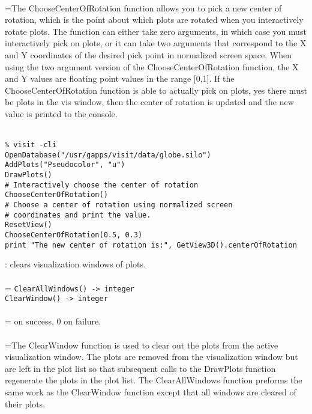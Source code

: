 \documentclass[10pt,a4paper]{report}
\begin{document}
 \\ 
\hangindent=\parindent The ChooseCenterOfRotation function allows you to pick a new center of rotation, which is the point about which plots are rotated when you interactively rotate plots. The function can either take zero arguments, in which case you must interactively pick on plots, or it can take two arguments that correspond to the X and Y coordinates of the desired pick point in normalized screen space. When using the two argument version of the ChooseCenterOfRotation function, the X and Y values are floating point values in the range [0,1]. If the ChooseCenterOfRotation function is able to actually pick on plots, yes there must be plots in the vis window, then the center of rotation is updated and the new value is printed to the console. \\[-3mm] 

\\[-6mm]
\begin{verbatim}% visit -cli
OpenDatabase("/usr/gapps/visit/data/globe.silo")
AddPlots("Pseudocolor", "u")
DrawPlots()
# Interactively choose the center of rotation
ChooseCenterOfRotation()
# Choose a center of rotation using normalized screen 
# coordinates and print the value.
ResetView()
ChooseCenterOfRotation(0.5, 0.3)
print "The new center of rotation is:", GetView3D().centerOfRotation
\end{verbatim}
\newpage


{}
: clears visualization windows of plots.\\[-3mm]

 \\ 
\hangindent=\parindent 
\verb!ClearAllWindows() -> integer!\\ 
\verb!ClearWindow() -> integer!\\ [-3mm]

 \\ 
\hangindent= on success, 0 on failure. \\[-3mm] 

 \\ 
\hangindent=\parindent The ClearWindow function is used to clear out the plots from the active visualization window. The plots are removed from the visualization window but are left in the plot list so that subsequent calls to the DrawPlots function regenerate the plots in the plot list. The ClearAllWindows function preforms the same work as the ClearWindow function except that all windows are cleared of their plots. \\[-3mm] 
\end{document}

